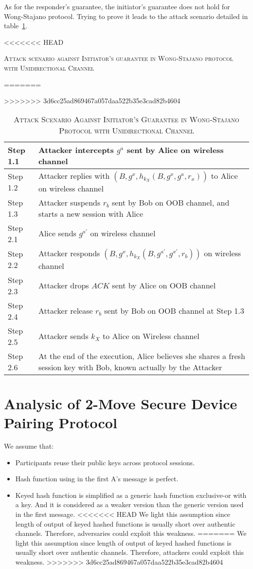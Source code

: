 \begin{itemize}
As for the responder's guarantee, the initiator's guarantee does not hold for Wong-Stajano protocol. Trying to prove it leads to the attack scenario detailed in table~\ref{attack-initiator}. 

\begin{table}[t]
\centering
<<<<<<< HEAD
\caption{\textsc{Attack scenario against Initiator's guarantee in Wong-Stajano protocol with Unidirectional Channel}}
=======
\caption{\textsc{Attack Scenario Against Initiator's Guarantee in Wong-Stajano Protocol with Unidirectional Channel}}
>>>>>>> 3d6cc25ad869467a057daa522b35e3cad82b4604
\label{attack-initiator}
{\small
\begin{tabular}{| l | p{11cm} |}
 \hline
 Step 1.1 & Attacker intercepts $g^{a}$ sent by Alice on wireless channel\\ \hline
 Step 1.2 & Attacker replies with $(B, g^{x}, h_{k_X}(B,g^{x},g^a,r_x))$ to Alice on wireless channel\\ \hline
 Step 1.3 & Attacker suspends $r_b$ sent by Bob on OOB channel, and starts a new session with Alice\\ \hline \hline
 Step 2.1 & Alice sends $g^{a'}$ on wireless channel\\ \hline
 Step 2.2 & Attacker responds $(B, g^{x}, h_{k_X}(B,g^{a'},g^{x'},r_b))$ on wireless channel\\ \hline
 Step 2.3 & Attacker drops $ACK$ sent by Alice on OOB channel\\ \hline
 Step 2.4 & Attacker release $r_b$ sent by Bob on OOB channel at Step 1.3\\ \hline
 Step 2.5 & Attacker sends $k_X$ to Alice on Wireless channel\\ \hline
 Step 2.6 & At the end of the execution, Alice believes she shares a fresh session key with Bob, known actually by the Attacker\\ \hline
\end{tabular}
}
\end{table}


\section{Analysic of 2-Move Secure Device Pairing Protocol}\label{chap42move}

We assume that:
\begin{itemize}
\item Participants reuse their public keys across protocol sessions. 
\item Hash function using in the first A's message is perfect. 
\item Keyed hash function is simplified as a generic hash function exclusive-or with a key. And it is considered as a weaker version than the generic version used in the first message. 
<<<<<<< HEAD
We light this assumption since length of output of keyed hashed functions is usually short over authentic channels. Therefore, adversaries could exploit this weakness. 
=======
We light this assumption since length of output of keyed hashed functions is usually short over authentic channels. Therefore, attackers could exploit this weakness. 
>>>>>>> 3d6cc25ad869467a057daa522b35e3cad82b4604
\end{itemize}


\end{itemize}
